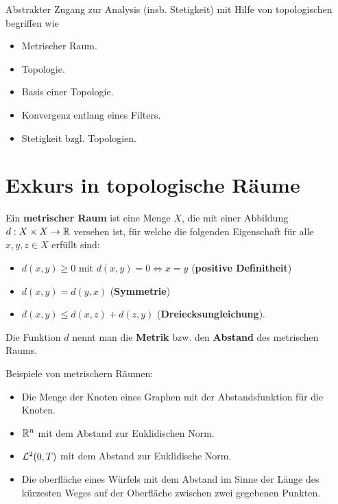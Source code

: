 \begin{bem}
	Abstrakter Zugang zur Analysis (insb. Stetigkeit) mit Hilfe von topologischen begriffen wie 
	\begin{itemize}
			\item[] Metrischer Raum.
			\item[] Topologie. 
			\item[] Basis einer Topologie.
			\item[] Konvergenz entlang eines Filters. 
			\item[] Stetigkeit bzgl. Topologien.  
	\end{itemize} 
\end{bem} 

\section{Exkurs in topologische Räume} 

\begin{defn}
	Ein \textbf{metrischer Raum} ist eine Menge $X$, die mit einer Abbildung $d : X \times X \to \mathbb{R}$ versehen ist, für welche die folgenden Eigenschaft für alle $x,y,z \in X$  erfüllt sind: 
	\begin{itemize}
			\item[] $d(x,y) \ge 0$ mit $d(x,y)=0 \Leftrightarrow x=y$ \qquad (\textbf{positive Definitheit})
			\item[] $d(x,y) = d(y,x)$ \qquad (\textbf{Symmetrie}) 
			\item[] $d(x,y) \le d(x,z) + d(z,y)$ \qquad (\textbf{Dreiecksungleichung}).  
	\end{itemize} 
	Die Funktion $d$ nennt man die \textbf{Metrik} bzw. den \textbf{Abstand} des metrischen Raums. 
\end{defn} 

\begin{bem}
	Beispiele von metrischern Räumen: 
	\begin{itemize}
			\item[] Die Menge der Knoten eines Graphen mit der Abstandsfunktion für die Knoten. 
			\item[] $\mathbb{R}^n$ mit dem Abstand zur Euklidischen Norm. 
			\item[] $\mathcal{L}^2(0,T)$ mit dem Abstand zur Euklidische Norm. 
			\item[] Die oberfläche eines Würfels mit dem Abstand im Sinne der Länge des kürzesten Weges auf der Oberfläche zwischen zwei gegebenen Punkten. 
	\end{itemize} 
\end{bem} 

